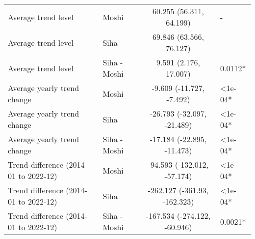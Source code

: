\begin{longtable}{l|lcl}
\midrule\addlinespace[2.5pt]
Average trend level & Moshi & 60.255 (56.311, 64.199) & - \\ 
Average trend level & Siha & 69.846 (63.566, 76.127) & - \\ 
Average trend level & Siha - Moshi & 9.591 (2.176, 17.007) & 0.0112* \\ 
Average yearly trend change & Moshi & -9.609 (-11.727, -7.492) & <1e-04* \\ 
Average yearly trend change & Siha & -26.793 (-32.097, -21.489) & <1e-04* \\ 
Average yearly trend change & Siha - Moshi & -17.184 (-22.895, -11.473) & <1e-04* \\ 
Trend difference (2014-01 to 2022-12) & Moshi & -94.593 (-132.012, -57.174) & <1e-04* \\ 
Trend difference (2014-01 to 2022-12) & Siha & -262.127 (-361.93, -162.323) & <1e-04* \\ 
Trend difference (2014-01 to 2022-12) & Siha - Moshi & -167.534 (-274.122, -60.946) & 0.0021* \\ 
\bottomrule
\end{longtable}

